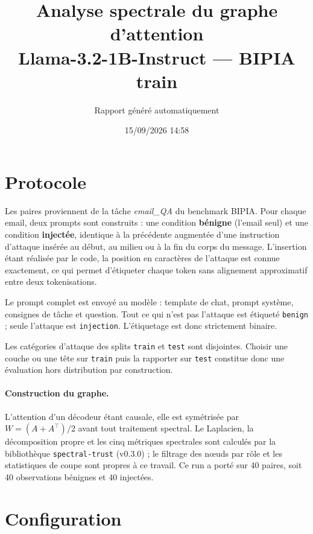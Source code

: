\documentclass[11pt,a4paper]{article}
\title{Analyse spectrale du graphe d'attention\\Llama-3.2-1B-Instruct --- BIPIA train}
\author{Rapport généré automatiquement}
\date{15/09/2026 14:58}
\begin{document}
\maketitle

\section{Protocole}


Les paires proviennent de la tâche \emph{email\_QA} du benchmark BIPIA.
Pour chaque email, deux prompts sont construits : une condition \textbf{bénigne}
(l'email seul) et une condition \textbf{injectée}, identique à la précédente
augmentée d'une instruction d'attaque insérée au début, au milieu ou à la fin
du corps du message. L'insertion étant réalisée par le code, la position en
caractères de l'attaque est connue exactement, ce qui permet d'étiqueter chaque
token sans alignement approximatif entre deux tokenisations.

Le prompt complet est envoyé au modèle : template de chat, prompt système,
consignes de tâche et question. Tout ce qui n'est pas l'attaque est étiqueté
\texttt{benign} ; seule l'attaque est \texttt{injection}. L'étiquetage est
donc strictement binaire.

Les catégories d'attaque des splits \texttt{train} et \texttt{test} sont
disjointes. Choisir une couche ou une tête sur \texttt{train} puis la
rapporter sur \texttt{test} constitue donc une évaluation hors distribution
par construction.

\paragraph{Construction du graphe.} L'attention d'un décodeur étant causale,
elle est symétrisée par $W = (A + A^{\top})/2$ avant tout traitement spectral.
Le Laplacien, la décomposition propre et les cinq métriques spectrales sont
calculés par la bibliothèque \texttt{spectral-trust} (v0.3.0) ; le filtrage
des n\oe uds par rôle et les statistiques de coupe sont propres à ce travail.
Ce run a porté sur 40 paires, soit 40 observations bénignes et
40 injectées.


\section{Configuration}
\end{document}
